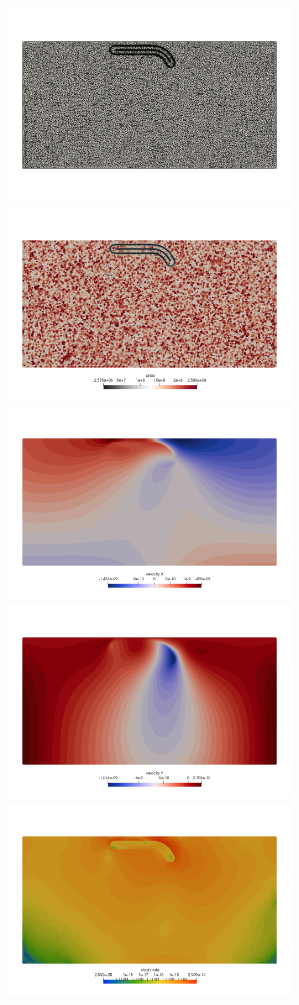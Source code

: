 \begin{center}
\includegraphics[width=7.5cm]{python_codes/fieldstone_55/images/mesh}
\includegraphics[width=7.5cm]{python_codes/fieldstone_55/images/area}\\
\includegraphics[width=7.5cm]{python_codes/fieldstone_55/images/u}
\includegraphics[width=7.5cm]{python_codes/fieldstone_55/images/v}\\
\includegraphics[width=7.5cm]{python_codes/fieldstone_55/images/sr}

\end{center}
